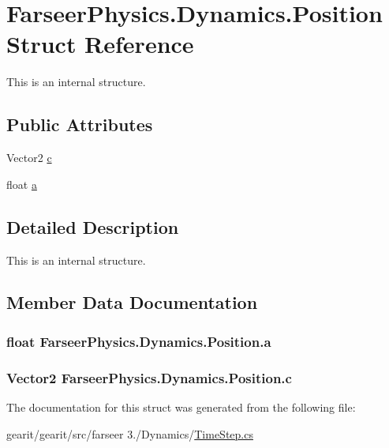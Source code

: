 \hypertarget{struct_farseer_physics_1_1_dynamics_1_1_position}{\section{Farseer\+Physics.\+Dynamics.\+Position Struct Reference}
\label{struct_farseer_physics_1_1_dynamics_1_1_position}
}


This is an internal structure.  


\subsection*{Public Attributes}
\begin{DoxyCompactItemize}
\item 
Vector2 \hyperlink{struct_farseer_physics_1_1_dynamics_1_1_position_a9f7e4f8242c042644709c4a6ef0a67f4}{c}
\item 
float \hyperlink{struct_farseer_physics_1_1_dynamics_1_1_position_ae9b19712dbe3a80c20baf3522288b27b}{a}
\end{DoxyCompactItemize}


\subsection{Detailed Description}
This is an internal structure. 

\subsection{Member Data Documentation}
\hypertarget{struct_farseer_physics_1_1_dynamics_1_1_position_ae9b19712dbe3a80c20baf3522288b27b}{
\subsubsection[{a}]{\setlength{\rightskip}{0pt plus 5cm}float Farseer\+Physics.\+Dynamics.\+Position.\+a}}\label{struct_farseer_physics_1_1_dynamics_1_1_position_ae9b19712dbe3a80c20baf3522288b27b}
\hypertarget{struct_farseer_physics_1_1_dynamics_1_1_position_a9f7e4f8242c042644709c4a6ef0a67f4}{
\subsubsection[{c}]{\setlength{\rightskip}{0pt plus 5cm}Vector2 Farseer\+Physics.\+Dynamics.\+Position.\+c}}\label{struct_farseer_physics_1_1_dynamics_1_1_position_a9f7e4f8242c042644709c4a6ef0a67f4}


The documentation for this struct was generated from the following file\+:\begin{DoxyCompactItemize}
\item 
gearit/gearit/src/farseer 3./\+Dynamics/\hyperlink{_time_step_8cs}{Time\+Step.\+cs}\end{DoxyCompactItemize}
